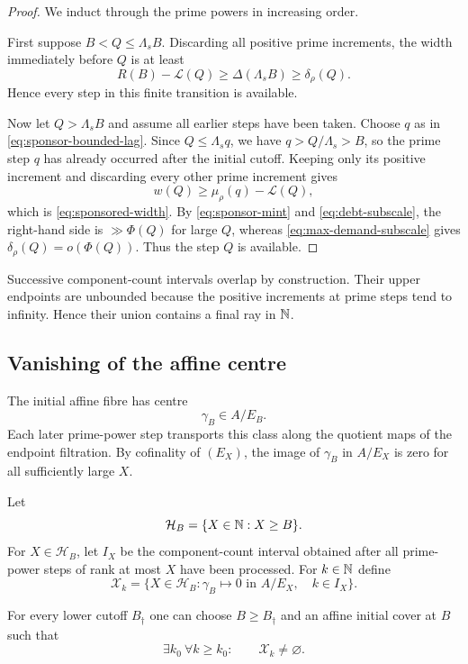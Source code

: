 \begin{proof}
We induct through the prime powers in increasing order.

First suppose $B<Q\le\Lambda_sB$.  Discarding all positive prime increments, the width immediately before $Q$ is at least
\[
R(B)-\mathcal L(Q)
\ge
\Delta(\Lambda_sB)
\ge
\delta_\rho(Q).
\]
Hence every step in this finite transition is available.

Now let $Q>\Lambda_sB$ and assume all earlier steps have been taken.  Choose $q$ as in \eqref{eq:sponsor-bounded-lag}.  Since $Q\le\Lambda_s q$, we have $q>Q/\Lambda_s>B$, so the prime step $q$ has already occurred after the initial cutoff.  Keeping only its positive increment and discarding every other prime increment gives
\[
w(Q)\ge\mu_\rho(q)-\mathcal L(Q),
\]
which is \eqref{eq:sponsored-width}.  By \eqref{eq:sponsor-mint} and \eqref{eq:debt-subscale}, the right-hand side is $\gg\Phi(Q)$ for large $Q$, whereas \eqref{eq:max-demand-subscale} gives $\delta_\rho(Q)=o(\Phi(Q))$.  Thus the step $Q$ is available.
\end{proof}

Successive component-count intervals overlap by construction.  Their upper endpoints are unbounded because the positive increments at prime steps tend to infinity.  Hence their union contains a final ray in $\mathbb N$.

\subsection{Vanishing of the affine centre}

The initial affine fibre has centre
\[
\gamma_B\in A/E_B.
\]
Each later prime-power step transports this class along the quotient maps of the endpoint filtration.  By cofinality of $(E_X)$, the image of $\gamma_B$ in $A/E_X$ is zero for all sufficiently large $X$.

Let
\begin{equation}\label{eq:cutoff-base}
\mathcal H_B=\{X\in\mathbb N:X\ge B\}.
\end{equation}
For $X\in\mathcal H_B$, let $I_X$ be the component-count interval obtained after all prime-power steps of rank at most $X$ have been processed.  For $k\in\mathbb N$ define
\begin{equation}\label{eq:term-k}
\mathcal X_k=
\{X\in\mathcal H_B:
\gamma_B\mapsto0\text{ in }A/E_X,
\quad k\in I_X\}.
\end{equation}

\begin{theorem}\label{thm:scalar-terminality}
For every lower cutoff $B_\dagger$ one can choose $B\ge B_\dagger$ and an affine initial cover at $B$ such that
\[
\exists k_0\ \forall k\ge k_0:
\qquad \mathcal X_k\ne\varnothing.
\]
\end{theorem}

